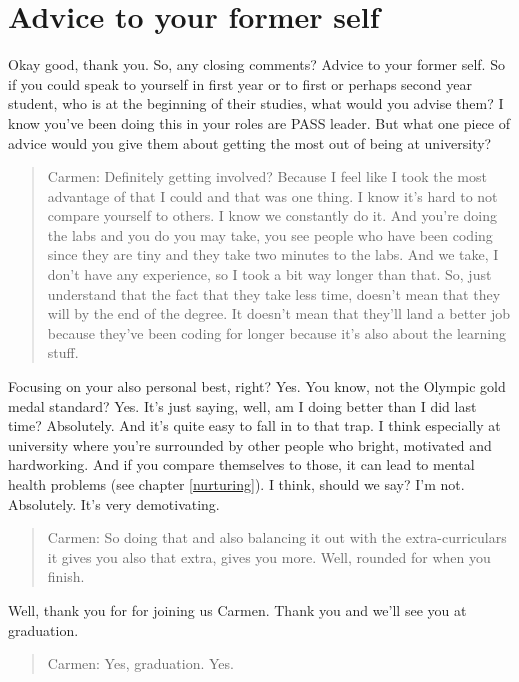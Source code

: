 \documentclass[
]{book}
\begin{document}
\hypertarget{carmen-time}{%
\section{Advice to your former self}\label{carmen-time}}

Okay good, thank you. So, any closing comments? Advice to your former self. So if you could speak to yourself in first year or to first or perhaps second year student, who is at the beginning of their studies, what would you advise them? I know you've been doing this in your roles are PASS leader. But what one piece of advice would you give them about getting the most out of being at university?

\begin{quote}
Carmen: Definitely getting involved? Because I feel like I took the most advantage of that I could and that was one thing. I know it's hard to not compare yourself to others. I know we constantly do it. And you're doing the labs and you do you may take, you see people who have been coding since they are tiny and they take two minutes to the labs. And we take, I don't have any experience, so I took a bit way longer than that. So, just understand that the fact that they take less time, doesn't mean that they will by the end of the degree. It doesn't mean that they'll land a better job because they've been coding for longer because it's also about the learning stuff.
\end{quote}

Focusing on your also personal best, right? Yes. You know, not the Olympic gold medal standard? Yes. It's just saying, well, am I doing better than I did last time? Absolutely. And it's quite easy to fall in to that trap. I think especially at university where you're surrounded by other people who bright, motivated and hardworking. And if you compare themselves to those, it can lead to mental health problems (see chapter \ref{nurturing}). I think, should we say? I'm not. Absolutely. It's very demotivating.

\begin{quote}
Carmen: So doing that and also balancing it out with the extra-curriculars it gives you also that extra, gives you more. Well, rounded for when you finish.
\end{quote}

Well, thank you for for joining us Carmen. Thank you and we'll see you at graduation.

\begin{quote}
Carmen: Yes, graduation. Yes.
\end{quote}
\end{document}
